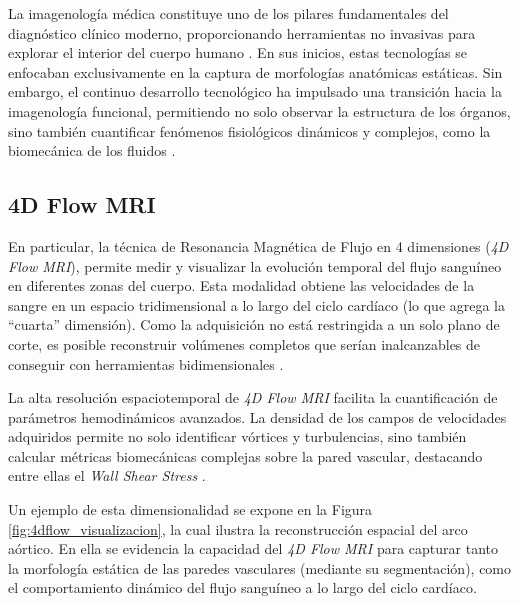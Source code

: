\label{ch:definicion}

La imagenología médica constituye uno de los pilares fundamentales del diagnóstico clínico moderno, proporcionando herramientas no invasivas para explorar el interior del cuerpo humano \cite{ELLIOTT20051}. En sus inicios, estas tecnologías se enfocaban exclusivamente en la captura de morfologías anatómicas estáticas. Sin embargo, el continuo desarrollo tecnológico ha impulsado una transición hacia la imagenología funcional, permitiendo no solo observar la estructura de los órganos, sino también cuantificar fenómenos fisiológicos dinámicos y complejos, como la biomecánica de los fluidos \cite{Antiga2008}.

\subsection{4D Flow MRI}

En particular, la técnica de Resonancia Magnética de Flujo en 4 dimensiones (\textit{4D Flow MRI}), permite medir y visualizar la evolución temporal del flujo sanguíneo en diferentes zonas del cuerpo. Esta modalidad obtiene las velocidades de la sangre en un espacio tridimensional a lo largo del ciclo cardíaco (lo que agrega la ``cuarta'' dimensión). Como la adquisición no está restringida a un solo plano de corte, es posible reconstruir volúmenes completos que serían inalcanzables de conseguir con herramientas bidimensionales \cite{markl2012_4dflow}. 

La alta resolución espaciotemporal de \textit{4D Flow MRI} facilita la cuantificación de parámetros hemodinámicos avanzados. La densidad de los campos de velocidades adquiridos permite no solo identificar vórtices y turbulencias, sino también calcular métricas biomecánicas complejas sobre la pared vascular, destacando entre ellas el \textit{Wall Shear Stress} \cite{Morgan2021}.

Un ejemplo de esta dimensionalidad se expone en la Figura \ref{fig:4dflow_visualizacion}, la cual ilustra la reconstrucción espacial del arco aórtico. En ella se evidencia la capacidad del \textit{4D Flow MRI} para capturar tanto la morfología estática de las paredes vasculares (mediante su segmentación), como el comportamiento dinámico del flujo sanguíneo a lo largo del ciclo cardíaco.

